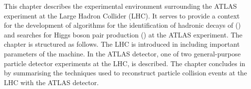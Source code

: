 This chapter describes the experimental environment surrounding the ATLAS
experiment at the Large Hadron Collider (LHC). It serves to provide a context
for the development of algorithms for the identification of hadronic decays of
\tauleptons () and searches for Higgs boson pair production
() at the ATLAS experiment. The
chapter is structured as follows. The LHC is introduced in 
including important parameters of the machine. In  the ATLAS
detector, one of two general-purpose particle detector experiments at the LHC,
is described. The chapter concludes in  by
summarising the techniques used to reconstruct particle collision events at the
LHC with the ATLAS detector.

